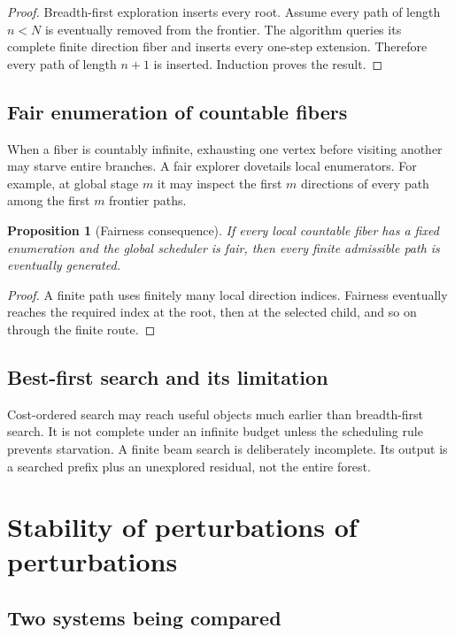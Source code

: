\documentclass[11pt,openany]{report}
\newtheorem{proposition}[theorem]{Proposition}
\theoremstyle{definition}
\theoremstyle{remark}
\begin{document}
\begin{proof}
Breadth-first exploration inserts every root. Assume every path of length $n<N$ is eventually removed from the frontier. The algorithm queries its complete finite direction fiber and inserts every one-step extension. Therefore every path of length $n+1$ is inserted. Induction proves the result.
\end{proof}

\section{Fair enumeration of countable fibers}

When a fiber is countably infinite, exhausting one vertex before visiting another may starve entire branches. A fair explorer dovetails local enumerators. For example, at global stage $m$ it may inspect the first $m$ directions of every path among the first $m$ frontier paths.

\begin{proposition}[Fairness consequence]
If every local countable fiber has a fixed enumeration and the global scheduler is fair, then every finite admissible path is eventually generated.
\end{proposition}

\begin{proof}
A finite path uses finitely many local direction indices. Fairness eventually reaches the required index at the root, then at the selected child, and so on through the finite route.
\end{proof}

\section{Best-first search and its limitation}

Cost-ordered search may reach useful objects much earlier than breadth-first search. It is not complete under an infinite budget unless the scheduling rule prevents starvation. A finite beam search is deliberately incomplete. Its output is a searched prefix plus an unexplored residual, not the entire forest.

\chapter{Stability of perturbations of perturbations}

\section{Two systems being compared}
\end{document}

